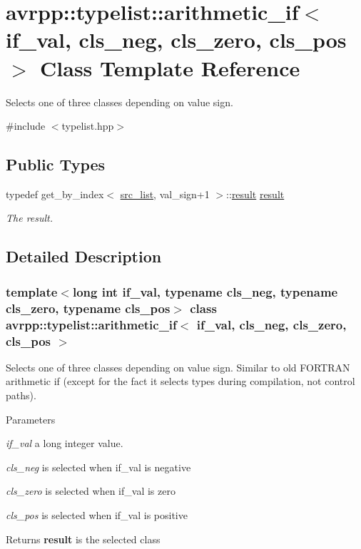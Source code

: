 \hypertarget{classavrpp_1_1typelist_1_1arithmetic__if}{
\section{avrpp::typelist::arithmetic\_\-if$<$ if\_\-val, cls\_\-neg, cls\_\-zero, cls\_\-pos $>$ Class Template Reference}
\label{classavrpp_1_1typelist_1_1arithmetic__if}
}


Selects one of three classes depending on value sign.  




{\ttfamily \#include $<$typelist.hpp$>$}

\subsection*{Public Types}
\begin{DoxyCompactItemize}
\item 
typedef get\_\-by\_\-index$<$ \hyperlink{structavrpp_1_1typelist_1_1typelist}{src\_\-list}, val\_\-sign+1 $>$::\hyperlink{classavrpp_1_1typelist_1_1arithmetic__if_a02b41945cc22084e2a91956e58366c6a}{result} \hyperlink{classavrpp_1_1typelist_1_1arithmetic__if_a02b41945cc22084e2a91956e58366c6a}{result}
\begin{DoxyCompactList}\small\item\em The result. \item\end{DoxyCompactList}\end{DoxyCompactItemize}


\subsection{Detailed Description}
\subsubsection*{template$<$long int if\_\-val, typename cls\_\-neg, typename cls\_\-zero, typename cls\_\-pos$>$ class avrpp::typelist::arithmetic\_\-if$<$ if\_\-val, cls\_\-neg, cls\_\-zero, cls\_\-pos $>$}

Selects one of three classes depending on value sign. Similar to old FORTRAN arithmetic if (except for the fact it selects types during compilation, not control paths).


\begin{DoxyParams}{Parameters}
\item[{\em if\_\-val}]a long integer value. \item[{\em cls\_\-neg}]is selected when if\_\-val is negative \item[{\em cls\_\-zero}]is selected when if\_\-val is zero \item[{\em cls\_\-pos}]is selected when if\_\-val is positive \end{DoxyParams}
\begin{DoxyReturn}{Returns}
{\bfseries result} is the selected class 
\end{DoxyReturn}


